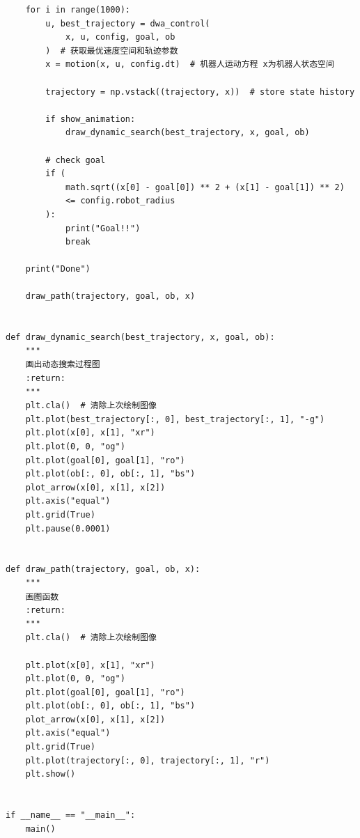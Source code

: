 \begin{verbatim}
    for i in range(1000):
        u, best_trajectory = dwa_control(
            x, u, config, goal, ob
        )  # 获取最优速度空间和轨迹参数
        x = motion(x, u, config.dt)  # 机器人运动方程 x为机器人状态空间

        trajectory = np.vstack((trajectory, x))  # store state history

        if show_animation:
            draw_dynamic_search(best_trajectory, x, goal, ob)

        # check goal
        if (
            math.sqrt((x[0] - goal[0]) ** 2 + (x[1] - goal[1]) ** 2)
            <= config.robot_radius
        ):
            print("Goal!!")
            break

    print("Done")

    draw_path(trajectory, goal, ob, x)


def draw_dynamic_search(best_trajectory, x, goal, ob):
    """
    画出动态搜索过程图
    :return:
    """
    plt.cla()  # 清除上次绘制图像
    plt.plot(best_trajectory[:, 0], best_trajectory[:, 1], "-g")
    plt.plot(x[0], x[1], "xr")
    plt.plot(0, 0, "og")
    plt.plot(goal[0], goal[1], "ro")
    plt.plot(ob[:, 0], ob[:, 1], "bs")
    plot_arrow(x[0], x[1], x[2])
    plt.axis("equal")
    plt.grid(True)
    plt.pause(0.0001)


def draw_path(trajectory, goal, ob, x):
    """
    画图函数
    :return:
    """
    plt.cla()  # 清除上次绘制图像

    plt.plot(x[0], x[1], "xr")
    plt.plot(0, 0, "og")
    plt.plot(goal[0], goal[1], "ro")
    plt.plot(ob[:, 0], ob[:, 1], "bs")
    plot_arrow(x[0], x[1], x[2])
    plt.axis("equal")
    plt.grid(True)
    plt.plot(trajectory[:, 0], trajectory[:, 1], "r")
    plt.show()


if __name__ == "__main__":
    main()
\end{verbatim}
